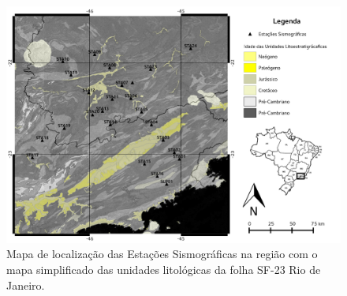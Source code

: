 \begin{figure}[!ht]
\centering
\includegraphics[scale=0.5]{mapa_estacoes_geologico.png}
\caption[Mapa de localização das Estações Sismográficas na região com o mapa geológico simplificado.]{Mapa de localização das Estações Sismográficas na região com o mapa simplificado das unidades litológicas da folha SF-23 Rio de Janeiro.}
\label{mapa_estacoes_geologico}
\end{figure}

